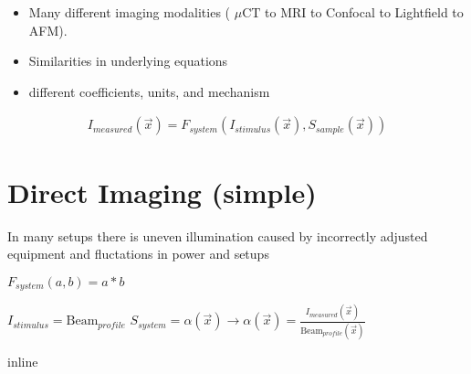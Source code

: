 \documentclass[letterpaper,10pt,english]{sphinxmanual}
\begin{document}
\begin{itemize}
\item {} 
\sphinxAtStartPar
Many different imaging modalities ( \(\mu \textrm{CT}\) to MRI to Confocal to Light\sphinxhyphen{}field to AFM).

\item {} 
\sphinxAtStartPar
Similarities in underlying equations

\item {} 
\sphinxAtStartPar
different coefficients, units, and mechanism

\end{itemize}
\begin{equation*}
\begin{split}I_{measured}(\vec{x})=F_{system}(I_{stimulus}(\vec{x}),S_{sample}(\vec{x}))\end{split}
\end{equation*}

\section{Direct Imaging (simple)}
\label{\detokenize{04-BasicSegmentation:direct-imaging-simple}}
\sphinxAtStartPar
In many setups there is un\sphinxhyphen{}even illumination caused by incorrectly adjusted equipment and fluctations in power and setups

\sphinxAtStartPar
\(F_{system}(a,b)=a*b\)

\sphinxAtStartPar
\(I_{stimulus}=\textrm{Beam}_{profile}\)
\(S_{system}=\alpha(\vec{x})\longrightarrow\alpha(\vec{x})=\frac{I_{measured}(\vec{x})}{\textrm{Beam}_{profile}(\vec{x})}\)

\begin{sphinxVerbatim}[commandchars=\\\{\}]
 inline
   
   
   
   
   
   
\end{sphinxVerbatim}
\end{document}
